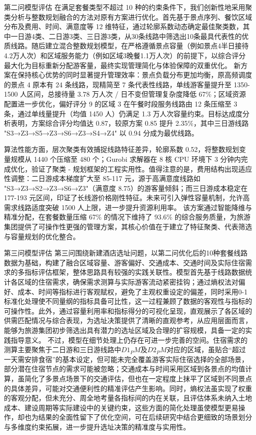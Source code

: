 \documentclass[12pt,a4paper]{article}
\begin{document}
第二问模型评估
	在满足套餐类型不超过 10 种的约束条件下，我们创新性地采用聚类分析与整数规划融合的方法对原有方案进行优化。首先基于景点序列、餐饮区域分布及费用、时间、满意度等 12 维特征，通过轮廓系数动态确定最佳聚类数，其中一日游4类、二日游3类、三日游3类，从30条线路中筛选出10条最具代表性的优质线路。随后建立混合整数规划模型，在严格遵循景点容量（例如景点4半日接待4.2万人次）和区域服务能力（例如区域3晚餐1.1万人次）的前提下，以综合评分最大化为目标重新分配游客量，最终实现管理简化与体验保障的双重优化。
新方案在保持核心优势的同时显著提升管理效率：景点负载分布更加均衡，原高频调度的景点 4 原本有 24 条线路，现精简至 7 条代表性线路，单线游客量提升至 1350-1500 人区间，总接待量 3.78 万人次 / 日不变但管理复杂度降低 67\%；区域资源配置进一步优化，偏好评分 9 的区域 3 在午餐时段服务线路由 12 条压缩至 3 条，通过单线量提升（均值 1450 人）仍满足 1.3 万人次容量约束。目标达成度分析表明，方案综合评分均值达 0.87，较原方案 0.85 提升 2.35\%，其中三日游线路 "S3→Z3→S5→Z3→S6→Z3→S4→Z4" 以 0.94 分成为最优线路。

算法性能方面，层次聚类有效捕捉线路特征差异，轮廓系数 0.52，将整数规划变量规模从 1440 个压缩至 480 个；Gurobi 求解器在 8 核 CPU 环境下 3 分钟内完成优化，验证了聚类 - 规划框架的工程实用性。值得注意的是，费用结构出现适应性调整：二日游成本梯度扩大至 85-117 元，源于高满意度线路如 "S3→Z3→S2→Z3→S6→Z3"（满意度 8.75）的游客量倾斜；而三日游成本稳定在 177-193 元区间，印证了长线游价格刚性特征。未来可引入弹性容量机制，允许高需求线路适度突破 1500 人上限，进一步提升资源利用率。
该方案通过智能降维与精准分配，在套餐数量压缩 67\% 的情况下维持了 93.6\% 的综合服务质量，为旅游集团提供了可操作性更强的管理方案，其核心价值在于建立了特征聚类、代表筛选与容量规划的优化整合。

第三问模型评估
第三问围绕新建酒店选址问题，以第二问优化后的10种套餐线路数据为基础，构建了融合区域容量、游客偏好、交通成本、交通时间及实际住宿需求的多指标评估框架，整体思路具有较强的实践关联性。模型首先基于线路数据统计各区域的住宿需求，确保需求测算与实际游客流动紧密挂钩；通过熵权法对偏好、成本、时间等指标进行客观赋权，避免了主观权重设定的偏差，同时采用0-1标准化处理使不同量纲的指标具备可比性，这一过程兼顾了数据的客观性与指标的可操作性。此外，通过容量利用率和指标得分的可视化呈现，直观展示了各区域的供需匹配情况与综合表现，为选址决策提供了清晰的直观参考，从应用层面而言，能够为旅游集团初步筛选出具有潜力的选址区域及合理的扩容规模，具备一定的实践指导意义。 
不过，模型在细节处理上仍存在可进一步完善的空间。住宿需求的测算主要聚焦于二日游和三日游线路中\(D1_PM\)及\(D2_PM\)对应的区域，虽贴合“超过一天需安排食宿”的基本设定，但可能未完全覆盖游客实际住宿选择的全部场景，部分潜在住宿节点的需求可能被忽略；交通成本与时间采用区域到各景点的均值计算，虽简化了多景点场景下的交通评估，但也在一定程度上抹平了区域到不同景点的具体差异，可能对交通便利性的精准评估产生影响。同时，熵权法虽实现了权重的客观分配，但未充分、周全地考量各指标间的内在关联，且评估体系未纳入土地成本、建设周期等实际建设中的关键约束，这些方面的简化处理虽使模型更易操作，却也为结果的全面性留下了优化空间，可在后续研究中结合更细致的场景划分与多维度约束拓展，进一步提升选址决策的精准度与实用性。
\end{document}
